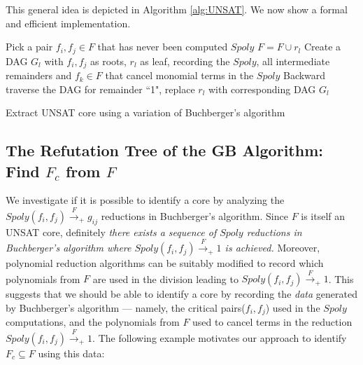 This general idea is depicted in Algorithm \ref{alg:UNSAT}. 
We now show a formal and efficient implementation.

\begin{algorithm}[hbt]
\SetAlgoNoLine
\LinesNumbered
{
	Pick a pair $f_i,f_j\in F$ that has never been computed $Spoly$\;
	{
		$F = F\cup r_l$\;
		Create a DAG $G_l$ with $f_i,f_j$ as roots, $r_l$ as leaf, recording the $Spoly$, all intermediate remainders and $f_k\in F$ that cancel monomial terms in the $Spoly$\;
	}
}
Backward traverse the DAG for remainder ``1", replace $r_l$ with corresponding DAG $G_l$\;
\caption {Extract UNSAT core using a variation of Buchberger's algorithm}\label{alg:UNSAT}
\end{algorithm}

\subsection{The Refutation Tree of the GB Algorithm: Find $F_c$ from $F$}

We investigate if it is possible to identify a core by analyzing the
$Spoly(f_i,f_j)\xrightarrow{F}_+ g_{ij}$ reductions in Buchberger's
algorithm. Since $F$ is itself an UNSAT core, 
definitely {\it there exists  
a sequence of $Spoly$ reductions in Buchberger's algorithm where
$Spoly(f_i, f_j) \xrightarrow{F}_+ 1$ is achieved.} Moreover, 
polynomial reduction algorithms can be suitably modified to record
which polynomials from $F$ are used in the division leading to
$Spoly(f_i,f_j)\xrightarrow{F}_+1$. This suggests that 
we should be able to identify a core by recording
the {\it data} generated by Buchberger's algorithm --- namely, the
critical pairs($f_i,f_j$) used in the $Spoly$ computations,
and the polynomials from $F$ used to cancel terms in the reduction
$Spoly(f_i,f_j)\xrightarrow{F}_+1$. The following example motivates
our approach to identify  $F_c \subseteq F$ using this data:

